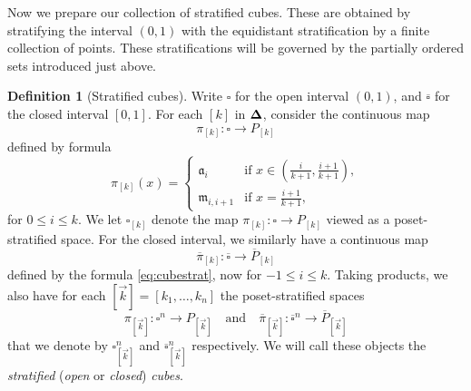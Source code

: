 \documentclass[10pt, reqno, twoside
, final
]{amsart}
\numberwithin{equation}{subsection}%
\theoremstyle{definition}
\newtheorem{defn}{Definition}[subsection]
\theoremstyle{definition}
\theoremstyle{definition}
\theoremstyle{definition}
\theoremstyle{definition}
\theoremstyle{definition}
\theoremstyle{definition}
\theoremstyle{definition}
\theoremstyle{definition}
\theoremstyle{plain}
\theoremstyle{definition}
\theoremstyle{plain}
\theoremstyle{definition}
\theoremstyle{plain}
\theoremstyle{definition}
\theoremstyle{definition}
\theoremstyle{plain}
\theoremstyle{plain}
\theoremstyle{definition}
\theoremstyle{plain}
\theoremstyle{plain}
\theoremstyle{plain}
\begin{document}
Now we prepare our collection of stratified cubes. These are obtained by stratifying the interval $(0,1)$ with the equidistant stratification by a finite collection of points. These stratifications will be governed by the partially ordered sets introduced just above. 
\begin{defn}[Stratified cubes]\label{defn:stratifiedcube}
Write $\square$ for the open interval $(0,1)$, and $\overline{\square}$ for the closed interval $[0,1]$. For each $[k]$ in $\boldsymbol{\Delta}$, consider the continuous map 
\[ \pi_{[k]}: \square\longrightarrow P_{[k]}  \]
defined by formula
\begin{equation}\label{eq:cubestrat}
\pi_{[k]}(x) =\begin{cases}
    \mathfrak{a}_i & \text{if } x\in \left(\frac{i}{k+1},\frac{i+1}{k+1}\right), \\
    \mathfrak{m}_{i,i+1} & \text{if } x=\frac{i+1}{k+1},
\end{cases}
\end{equation} 
for $0\leq i\leq k$. We let $\square_{[k]}$ denote the map $ \pi_{[k]}: \square\rightarrow P_{[k]}$ viewed as a poset-stratified space. For the closed interval, we similarly have a continuous map
\[ \overline{\pi}_{[k]}: \overline{\square}\longrightarrow \overline{P}_{[k]}  \]
defined by the formula \eqref{eq:cubestrat}, now for $-1\leq i\leq k$. Taking products, we also have for each $[\vec{k}]=[k_1,\ldots,k_n]$ the poset-stratified spaces
\[
\pi_{[\vec{k}]}:\square^{n} \longrightarrow P_{[\vec{k}]} \quad\text{and}\quad \overline{\pi}_{[\vec{k}]}:\overline{\square}^{n} \longrightarrow \overline{P}_{[\vec{k}]}
\]
that we denote by $\square^n_{[\vec{k}]}$ and $\overline{\square}^n_{[\vec{k}]}$ respectively. We will call these objects the \emph{stratified} (\emph{open} or \emph{closed}) \emph{cubes}.
\end{defn}
\end{document}
